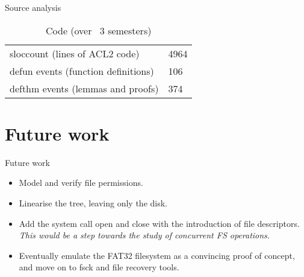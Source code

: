 \documentclass{beamer}
\begin{document}
\begin{frame}{Source analysis}
  \begin{table}[]
    \centering
    \caption{Code (over ~3 semesters)}
    \label{my-label}
    \begin{tabular}{ll}
      sloccount (lines of ACL2 code)      & 4964 \\
      defun events (function definitions) & 106  \\
      defthm events (lemmas and proofs)   & 374 
    \end{tabular}
  \end{table}
\end{frame}

\section{Future work}

\begin{frame}{Future work}
  \begin{itemize}
  \item Model and verify file permissions.
  \item Linearise the tree, leaving only the disk.
  \item Add the system call open and close with the
    introduction of file descriptors.\\
    \textit{This would be a step towards the study of concurrent FS operations.}
  \item Eventually emulate the FAT32 filesystem as a convincing proof
    of concept, and move on to fsck and file recovery tools.
  \end{itemize}
\end{frame}
\end{document}
